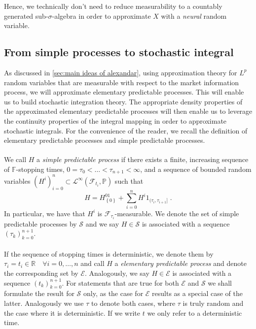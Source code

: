 \documentclass[11pt]{report}
\theoremstyle{plain} %
\theoremstyle{definition} %
\theoremstyle{remark} %
\begin{document}
Hence, we technically don't need to reduce measurability to a countably generated sub-\(\sigma\)-algebra in order to approximate \(X\) with a \textit{neural} random variable. 
\bigbreak

\subsection{From simple processes to stochastic integral}\label{sec:From simple processes to stochastic integral}
As discussed in \cref{sec:main ideas of alexandar}, using approximation theory for \(L^p\) random variables that are measurable with respect to the market information process, we will approximate elementary predictable processes. This will enable us to build stochastic integration theory. The appropriate density properties of the approximated elementary predictable processes will then enable us to leverage the continuity properties of the integral mapping in order to approximate stochastic integrals. For the convenience of the reader, we recall the definition of elementary predictable processes and simple predictable processes.
\\\\
    We call \(H\) a \textit{simple predictable process} if there exists a finite, increasing sequence of \(\mathbb{F}\)-stopping times, \(0=\tau_0<\dots<\tau_{n+1}<\infty\), and a sequence of bounded random variables \((H^i)_{i=0}^n\subset\mathcal{L}^{\infty}(\mathcal{F}_{t_i},\mathbb{P})\) such that 
    \begin{equation}\label{eq:simple representation}
        H = H^01_{\left\{0\right\}}+\sum_{i=0}^nH^i1_{(\tau_i,\tau_{i+1}]}\;.
    \end{equation}
In particular, we have that \(H^i\) is \(\mathcal{F}_{\tau_i}\)-measurable. We denote the set of simple predictable processes by \(\mathcal{S}\) and we say \(H\in\mathcal{S}\) is associated with a sequence \((\tau_k)_{k=0}^{n+1}\). 
\\\\
If the sequence of stopping times is deterministic, we denote them by \(\tau_i=t_i\in\mathbb{R}\quad\forall i=0,\dots,n\) and call \(H\) a \textit{elementary predictable process} and denote the corresponding set by \(\mathcal{E}\). Analogously, we say \(H\in\mathcal{E}\) is associated with a sequence \((t_k)_{k=0}^{n+1}\).
\bigbreak
For statements that are true for both \(\mathcal{E}\) and \(\mathcal{S}\) we shall formulate the result for \(\mathcal{S}\) only, as the case for \(\mathcal{E}\) results as a special case of the latter. Analogously we use \(\tau\) to denote both cases, where \(\tau\) is truly random and the case where it is deterministic. If we write \(t\) we only refer to a deterministic time. \\\\
\end{document}
